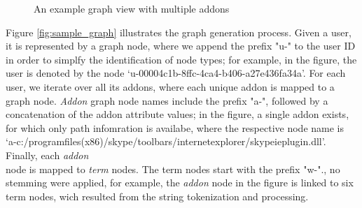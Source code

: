 \documentclass[11pt,oneside]{book}
\begin{document}
\begin{figure}
    \caption{An example graph view with multiple addons}
    \label{fig:sample_graph2}
  \end{figure}
  
Figure \ref{fig:sample_graph} illustrates the graph generation process. Given a user, it is represented by a graph node, where we append the prefix "u-" to the user ID in order to simplfy the identification of node types; for example, in the figure, the user is denoted by the node `u-00004c1b-8ffc-4ca4-b406-a27e436fa34a'. For each user, we iterate over all its addons, where each unique addon is mapped to a graph node. {\it Addon} graph node names include the prefix "a-", followed by a concatenation of the addon attribute values; in the figure, a single addon exists, for which only path infomration is availabe, where the respective node name is\\
`a-c:/programfiles(x86)/skype/toolbars/internetexplorer/skypeieplugin.dll'. Finally, each {\it addon} \\
node is mapped to {\it term} nodes. The term nodes start with the prefix "w-"., no stemming were applied, for example, the {\it addon} node in the figure is linked to six term nodes, wich resulted from the string tokenization and processing. 
  
\end{document}
